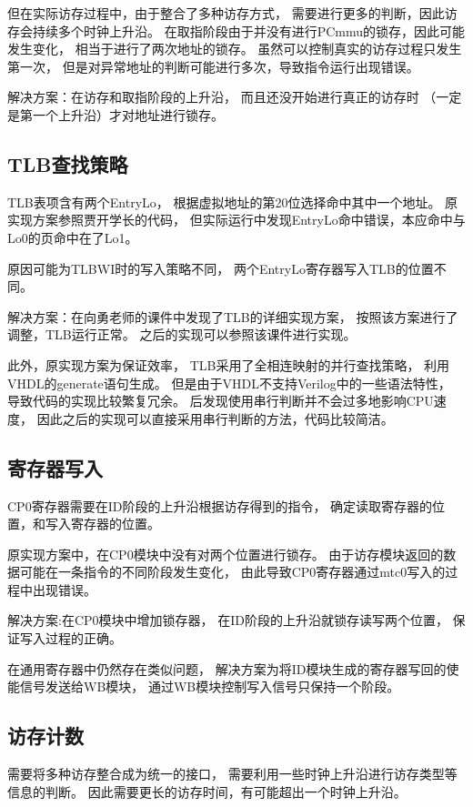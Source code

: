         但在实际访存过程中，由于整合了多种访存方式，%
        需要进行更多的判断，因此访存会持续多个时钟上升沿。%
        在取指阶段由于并没有进行PCmmu的锁存，因此可能发生变化，%
        相当于进行了两次地址的锁存。%
        虽然可以控制真实的访存过程只发生第一次，%
        但是对异常地址的判断可能进行多次，导致指令运行出现错误。

        解决方案：在访存和取指阶段的上升沿，%
        而且还没开始进行真正的访存时%
        （一定是第一个上升沿）才对地址进行锁存。

    \subsection{TLB查找策略}
        TLB表项含有两个EntryLo，%
        根据虚拟地址的第20位选择命中其中一个地址。%
        原实现方案参照贾开学长的代码，%
        但实际运行中发现EntryLo命中错误，本应命中与Lo0的页命中在了Lo1。

        原因可能为TLBWI时的写入策略不同，%
        两个EntryLo寄存器写入TLB的位置不同。

        解决方案：在向勇老师的课件中发现了TLB的详细实现方案，%
        按照该方案进行了调整，TLB运行正常。%
        之后的实现可以参照该课件进行实现。

        此外，原实现方案为保证效率，%
        TLB采用了全相连映射的并行查找策略，%
        利用VHDL的generate语句生成。%
        但是由于VHDL不支持Verilog中的一些语法特性，%
        导致代码的实现比较繁复冗余。%
        后发现使用串行判断并不会过多地影响CPU速度，%
        因此之后的实现可以直接采用串行判断的方法，代码比较简洁。

    \subsection{寄存器写入}
        CP0寄存器需要在ID阶段的上升沿根据访存得到的指令，%
        确定读取寄存器的位置，和写入寄存器的位置。

        原实现方案中，在CP0模块中没有对两个位置进行锁存。%
        由于访存模块返回的数据可能在一条指令的不同阶段发生变化，%
        由此导致CP0寄存器通过mtc0写入的过程中出现错误。

        解决方案:在CP0模块中增加锁存器，%
        在ID阶段的上升沿就锁存读写两个位置，%
        保证写入过程的正确。

        在通用寄存器中仍然存在类似问题，%
        解决方案为将ID模块生成的寄存器写回的使能信号发送给WB模块，%
        通过WB模块控制写入信号只保持一个阶段。

    \subsection{访存计数}
        需要将多种访存整合成为统一的接口，%
        需要利用一些时钟上升沿进行访存类型等信息的判断。%
        因此需要更长的访存时间，有可能超出一个时钟上升沿。%

